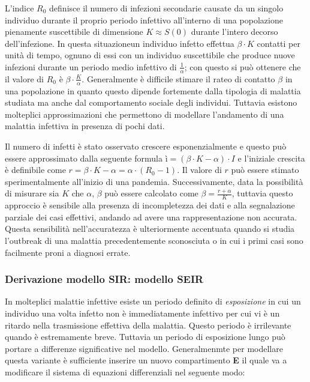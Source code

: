 L'indice $R_0$ definisce il numero di infezioni secondarie causate da un singolo individuo durante il proprio periodo infettivo 
all'interno di una popolazione pienamente suscettibile di dimensione $K \approx S(0)$ durante l'intero decorso dell'infezione. In 
questa situazioneun individuo infetto effettua $\beta \cdot K$ contatti per unità di tempo, ognuno di essi con un individuo suscettibile 
che produce nuove infezioni durante un periodo medio infettivo di $\frac{1}{\alpha}$; con questo si può ottenere che il valore di $R_0$ è 
$\beta \cdot \frac{K}{\alpha}$. Generalmente è difficile stimare il rateo di contatto $\beta$ in una popolazione in quanto questo dipende fortemente 
dalla tipologia di malattia studiata ma anche dal comportamento sociale degli individui. Tuttavia esistono molteplici approssimazioni 
che permettono di modellare l'andamento di una malattia infettiva in presenza di pochi dati. 

Il numero di infetti è stato osservato crescere esponenzialmente e questo può essere approssimato dalla seguente formula $ì = (\beta \cdot K - \alpha) \cdot I$
e l'iniziale crescita è definibile come $r = \beta \cdot K - \alpha = \alpha \cdot (R_0 - 1)$. Il valore di $r$ può essere stimato sperimentalmente 
all'inizio di una pandemia. Successivamente, data la possibilità di misurare sia $K$ che $\alpha$, $\beta$ può essere calcolato come 
$\beta = \frac{r + \alpha}{K}$, tuttavia questo approccio è sensibile alla presenza di incompletezza dei dati e alla segnalazione parziale dei casi effettivi, andando 
ad avere una rappresentazione non accurata. Questa sensibilità nell'accuratezza è ulteriormente accentuata quando si studia l'outbreak di una malattia 
precedentemente sconosciuta o in cui i primi casi sono facilmente proni a diagnosi errate.   

\subsubsection*{Derivazione modello SIR: modello SEIR}
In molteplici malattie infettive esiste un periodo definito di \emph{esposizione} in cui un individuo una volta infetto non 
è immediatamente infettivo per cui vi è un ritardo nella trasmissione effettiva della malattia. Questo periodo è irrilevante quando è estremamente breve. 
Tuttavia un periodo di esposizione lungo può portare a differenze significative nel modello. Generalmenmte per modellare questa variante è sufficiente 
inserire un nuovo compartimento \textbf{E} il quale va a modificare il sistema di equazioni differenziali nel seguente modo:

